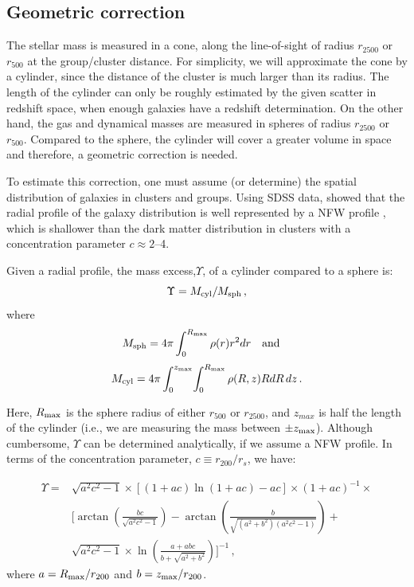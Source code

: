 \documentclass{aa}
\begin{document}
\begin{appendix}
\section{Geometric correction}

The stellar mass is measured in a cone, along the line-of-sight
  of radius $r_{2500}$ or $r_{500}$ at the group/cluster distance. For
  simplicity, we will approximate the cone by a cylinder, since the distance of the cluster 
  is much larger than its radius. The length
  of the cylinder can only be roughly estimated by the given scatter in
  redshift space, when enough galaxies have a redshift determination.
  On the other hand, the gas and dynamical masses are measured in
  spheres of radius $r_{2500}$ or $r_{500}$.  Compared to the sphere,
  the cylinder will cover a greater volume in space and therefore, a
  geometric correction is needed.

To estimate this correction, one must assume (or
  determine) the spatial distribution of galaxies in clusters and
  groups. Using SDSS data, \citet{hansen05} showed that the radial
  profile of the galaxy distribution is well represented by a NFW
  profile \citep{NFW97}, which is shallower than the dark matter distribution
  in clusters with a concentration parameter $c \approx 2$--4.

Given a radial profile, the mass excess,$\Upsilon$, of a cylinder compared to a sphere is:
%
\begin{equation}
\Upsilon = M_{\rm cyl} / M_{\rm sph} \, ,
\end{equation}
%
where
%
\begin{equation}
M_{\rm sph} = 4\pi \int_0^{R_{\rm max}} \rho(r) r^2 d r \quad \mbox{and} \quad
\end{equation}
\begin{equation}
M_{\rm cyl} = 4\pi \int_0^{z_{\rm max}}\!\int_0^{R_{\rm max}} \rho(R,z) R d R \, d z\, .
\end{equation}
%

Here, $R_{\rm max}$ is the sphere radius of either $r_{500}$ or $r_{2500}$, and $z_{max}$ is 
half the length of the cylinder (i.e., we are measuring the mass 
between $\pm z_{\rm max}$). Although cumbersome, $\Upsilon$ can be determined analytically, 
if we assume a NFW profile. In terms of the 
concentration parameter, $c \equiv r_{200}/r_s$, we have:
%

\begin{equation}
\begin{split}
 \Upsilon = & \sqrt{a^2 c^2 -1}\times [(1 + a c) \ln(1 + a c) - a c]  \times 
(1+ a c)^{-1} \times \\
 &  \bigg[ \arctan \left( \frac{b c}{\sqrt{a^2 c^2 -1}} \right) - 
\arctan \left(\frac{b}{\sqrt{(a^2+b^2)(a^2 c^2 - 1) }} \right)+ \\
 & \sqrt{a^2 c^2 - 1} \times \ln {\left( \frac{a + a b c}{b + \sqrt{a^2 + b^2}} \right)} \bigg]^{-1}
\, ,
\end{split}
\end{equation}
%
where $a = R_{\rm max}/r_{200}$ and $b= z_{\rm max}/r_{200}$.


\end{appendix}
\end{document}

